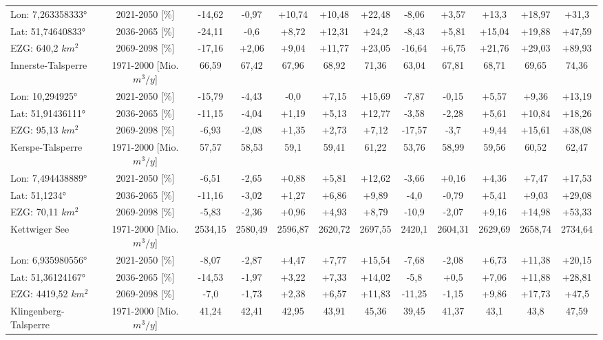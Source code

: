 \begin{longtable}{@{\extracolsep{\fill}}lc|ccccc||ccccc}
\cline{2-12} 
Lon: 7,263358333° & 2021-2050 [\%]  & -14,62 & -0,97 & +10,74 & +10,48 & +22,48 & -8,06 & +3,57 & +13,3 & +18,97 & +31,3\\ 
Lat: 51,74640833° & 2036-2065 [\%]  & -24,11 & -0,6 & +8,72 & +12,31 & +24,2 & -8,43 & +5,81 & +15,04 & +19,88 & +47,59\\ 
EZG: 640,2 $km^2$ & 2069-2098 [\%]  & -17,16 & +2,06 & +9,04 & +11,77 & +23,05 & -16,64 & +6,75 & +21,76 & +29,03 & +89,93\\ 
\hline 
Innerste-Talsperre & 1971-2000 [Mio. $m^3/y$]  & 66,59 & 67,42 & 67,96 & 68,92 & 71,36 & 63,04 & 67,81 & 68,71 & 69,65 & 74,36\\ 
\cline{2-12} 
Lon: 10,294925° & 2021-2050 [\%]  & -15,79 & -4,43 & -0,0 & +7,15 & +15,69 & -7,87 & -0,15 & +5,57 & +9,36 & +13,19\\ 
Lat: 51,91436111° & 2036-2065 [\%]  & -11,15 & -4,04 & +1,19 & +5,13 & +12,77 & -3,58 & -2,28 & +5,61 & +10,84 & +18,26\\ 
EZG: 95,13 $km^2$ & 2069-2098 [\%]  & -6,93 & -2,08 & +1,35 & +2,73 & +7,12 & -17,57 & -3,7 & +9,44 & +15,61 & +38,08\\ 
\hline 
Kerspe-Talsperre & 1971-2000 [Mio. $m^3/y$]  & 57,57 & 58,53 & 59,1 & 59,41 & 61,22 & 53,76 & 58,99 & 59,56 & 60,52 & 62,47\\ 
\cline{2-12} 
Lon: 7,494438889° & 2021-2050 [\%]  & -6,51 & -2,65 & +0,88 & +5,81 & +12,62 & -3,66 & +0,16 & +4,36 & +7,47 & +17,53\\ 
Lat: 51,1234° & 2036-2065 [\%]  & -11,16 & -3,02 & +1,27 & +6,86 & +9,89 & -4,0 & -0,79 & +5,41 & +9,03 & +29,08\\ 
EZG: 70,11 $km^2$ & 2069-2098 [\%]  & -5,83 & -2,36 & +0,96 & +4,93 & +8,79 & -10,9 & -2,07 & +9,16 & +14,98 & +53,33\\ 
\hline 
Kettwiger See & 1971-2000 [Mio. $m^3/y$]  & 2534,15 & 2580,49 & 2596,87 & 2620,72 & 2697,55 & 2420,1 & 2604,31 & 2629,69 & 2658,74 & 2734,64\\ 
\cline{2-12} 
Lon: 6,935980556° & 2021-2050 [\%]  & -8,07 & -2,87 & +4,47 & +7,77 & +15,54 & -7,68 & -2,08 & +6,73 & +11,38 & +20,15\\ 
Lat: 51,36124167° & 2036-2065 [\%]  & -14,53 & -1,97 & +3,22 & +7,33 & +14,02 & -5,8 & +0,5 & +7,06 & +11,88 & +28,81\\ 
EZG: 4419,52 $km^2$ & 2069-2098 [\%]  & -7,0 & -1,73 & +2,38 & +6,57 & +11,83 & -11,25 & -1,15 & +9,86 & +17,73 & +47,5\\ 
\hline 
Klingenberg-Talsperre & 1971-2000 [Mio. $m^3/y$]  & 41,24 & 42,41 & 42,95 & 43,91 & 45,36 & 39,45 & 41,37 & 43,1 & 43,8 & 47,59\\ 

\end{longtable}
